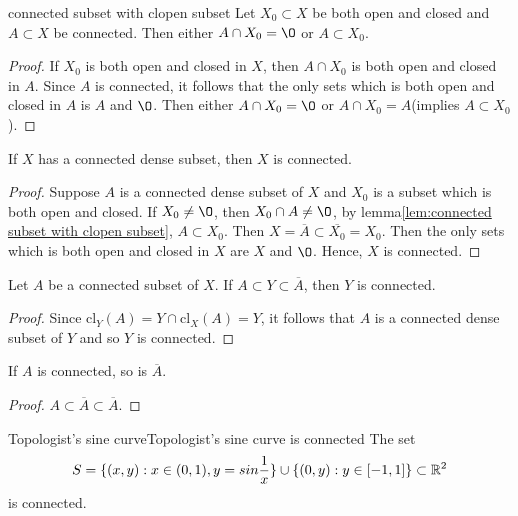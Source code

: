\begin{lemma}{}{connected subset with clopen subset}
    Let $X_0\subset X$ be both open and closed and $A\subset X$ be connected. 
    Then either $A\cap X_0=\O$ or $A\subset X_0$.
\end{lemma}

\begin{proof}
    If $X_0$ is both open and closed in $X$, then $A\cap X_0$ is both open and closed in $A$.
    Since $A$ is connected, it follows that the only sets which is both open and closed in $A$ is $A$ and $\O$.
    Then either $A\cap X_0=\O$ or $A\cap X_0=A$(implies $A\subset X_0$).
\end{proof}

\begin{proposition}{}{}
    If $X$ has a connected dense subset, then $X$ is connected.
\end{proposition}
\begin{proof}
    Suppose $A$ is a connected dense subset of $X$ and $X_0$ is a subset which is both open and closed.
    If $X_0\neq \O$, then $X_0\cap A\neq \O$, by lemma\ref{lem:connected subset with clopen subset}, $A\subset X_0$. 
    Then $X=\overline{A}\subset \overline{X_0}=X_0$. Then the only sets which is both open and closed in $X$ are $X$ and $\O$.
    Hence, $X$ is connected.
\end{proof}

\begin{corollary}{}{}
    Let $A$ be a connected subset of $X$. If $A\subset Y\subset \overline{A}$, then $Y$ is connected.
\end{corollary}
\begin{proof}
    Since $\text{cl}_Y(A)=Y\cap \text{cl}_X(A)=Y$, it follows that $A$ is a connected dense subset of $Y$ and so $Y$ is connected. 
\end{proof}

\begin{corollary}{}{}
    If $A$ is connected, so is $\overline{A}$.
\end{corollary}
\begin{proof}
    $A\subset \overline{A}\subset\overline{A}$.
\end{proof}

\begin{corollary}{Topologist's sine curve}{Topologist's sine curve is connected}
    The set 
    \begin{align*}
        S=\{(x,y):x\in (0,1),y=sin\frac{1}{x}\}\cup \{(0,y):y\in [-1,1]\}\subset \mathbb{R}^2
    \end{align*}
    is connected.
\end{corollary}

